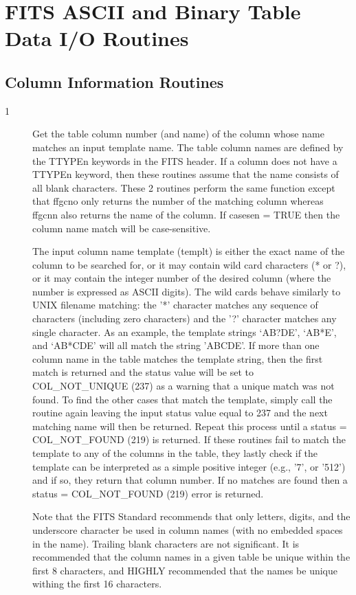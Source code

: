 \section{FITS ASCII and Binary Table Data I/O Routines}


\subsection{Column Information Routines \label{FFGCNO}}


\begin{description}
\item[1 ] Get the table column number (and name) of the column whose name
matches an input template name.  The table column names are defined by
the TTYPEn keywords in the FITS header.  If a column does not have a
TTYPEn keyword, then these routines assume that the name consists of
all blank characters.  These 2 routines perform the same function
except that ffgcno only returns the number of the matching column whereas
ffgcnn also returns the name of the column.  If casesen = TRUE then
the column name match will be case-sensitive.

The input column name template (templt) is either the exact name of the
column to be searched for, or it may contain wild card characters (* or
?), or it may contain the integer number of the desired column (where
the number is expressed as ASCII digits).  The wild cards behave
similarly to UNIX filename matching:  the '*' character matches any
sequence of characters (including zero characters) and the '?'
character matches any single character.  As an example, the template
strings `AB?DE', `AB*E', and `AB*CDE' will all match the string
'ABCDE'.  If more than one column name in the table matches the
template string, then the first match is returned and the status value
will be set to COL\_NOT\_UNIQUE (237) as a warning that a unique match
was not found.  To find the other cases that match the template, simply
call the routine again leaving the input status value equal to 237 and
the next matching name will then be returned.  Repeat this process
until a status = COL\_NOT\_FOUND (219) is returned.  If these routines
fail to match the template to any of the columns in the table, they
lastly check if the template can be interpreted as a simple positive
integer (e.g., '7', or '512') and if so, they return that column
number.  If no matches are found then a status = COL\_NOT\_FOUND (219)
error is returned.

Note that the FITS Standard recommends that only letters, digits, and
the underscore character be used in column names (with no embedded
spaces in the name).  Trailing blank characters are not significant.
It is recommended that the column names in a given table be unique
within the first 8 characters, and HIGHLY recommended that the names be
unique withing the first 16 characters.
\end{description}

